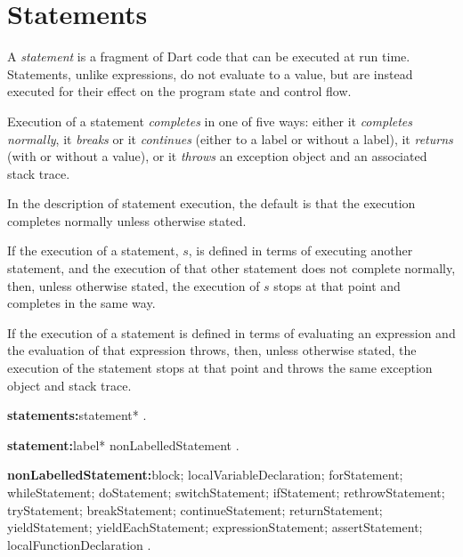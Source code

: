 \documentclass{article}
\begin{document}
\section{Statements}

\LMHash{}
A {\em statement} is a fragment of Dart code that can be executed at run time.
Statements, unlike expressions, do not evaluate to a value, but are instead executed for their effect on the program state and control flow.

\label{completion}
Execution of a statement {\em completes} in one of five ways: either it {\em completes normally}, it {\em breaks} or it {\em continues} (either to a label or without a label), it {\em returns} (with or without a value), or it {\em throws} an exception object and an associated stack trace.

In the description of statement execution, the default is that the execution
completes normally unless otherwise stated.

If the execution of a statement, $s$, is defined in terms of executing
another statement,
and the execution of that other statement does not complete normally,
then, unless otherwise stated, the execution of $s$ stops
at that point and completes in the same way.

If the execution of a statement is defined in terms of evaluating an expression
and the evaluation of that expression throws,
then, unless otherwise stated, the execution of the statement stops
at that point and throws the same exception object and stack trace.

\LMHash{}

\begin{grammar}
{\bf statements:}statement*
  .

{\bf statement:}label* nonLabelledStatement
  .

{\bf nonLabelledStatement:}block;
  localVariableDeclaration;
  forStatement;
  whileStatement;
  doStatement;
  switchStatement;
  ifStatement;
  rethrowStatement;
  tryStatement;
  breakStatement;
  continueStatement;
  returnStatement;
  yieldStatement;
  yieldEachStatement;
  expressionStatement;
  assertStatement;
  localFunctionDeclaration
  .
\end{grammar}
\end{document}

